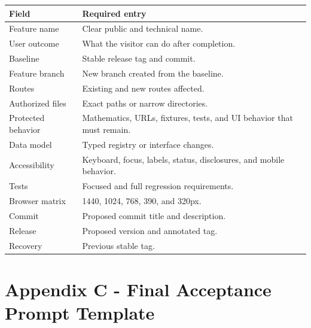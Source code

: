 \documentclass[11pt,letterpaper]{article}
\begin{document}
\begin{longtable}{L{1.8in}L{4.6in}}
\toprule
\textbf{Field} & \textbf{Required entry} \\
\midrule
Feature name & Clear public and technical name. \\
User outcome & What the visitor can do after completion. \\
Baseline & Stable release tag and commit. \\
Feature branch & New branch created from the baseline. \\
Routes & Existing and new routes affected. \\
Authorized files & Exact paths or narrow directories. \\
Protected behavior & Mathematics, URLs, fixtures, tests, and UI behavior that must remain. \\
Data model & Typed registry or interface changes. \\
Accessibility & Keyboard, focus, labels, status, disclosures, and mobile behavior. \\
Tests & Focused and full regression requirements. \\
Browser matrix & 1440, 1024, 768, 390, and 320px. \\
Commit & Proposed commit title and description. \\
Release & Proposed version and annotated tag. \\
Recovery & Previous stable tag. \\
\bottomrule
\end{longtable}

\section{Appendix C - Final Acceptance Prompt Template}
\end{document}

